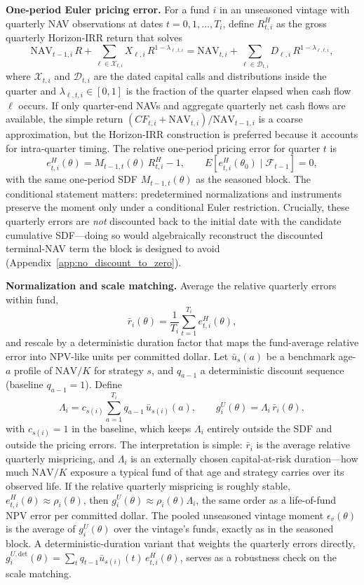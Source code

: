 \documentclass[11pt]{article}
\begin{document}
\textbf{One-period Euler pricing error.} For a fund \(i\) in an unseasoned vintage with quarterly NAV observations at dates \(t=0,1,\dots,T_i\), define \(R^H_{t,i}\) as the gross quarterly Horizon-IRR return that solves
\[
\mathrm{NAV}_{t-1,i}\,R
{}+
\sum_{\ell\in\mathcal X_{t,i}} X_{\ell,i}\, R^{1-\lambda_{\ell,t,i}}
=
\mathrm{NAV}_{t,i}
{}+
\sum_{\ell\in\mathcal D_{t,i}} D_{\ell,i}\, R^{1-\lambda_{\ell,t,i}},
\]
where \(\mathcal X_{t,i}\) and \(\mathcal D_{t,i}\) are the dated capital calls and distributions inside the quarter and \(\lambda_{\ell,t,i}\in[0,1]\) is the fraction of the quarter elapsed when cash flow \(\ell\) occurs. If only quarter-end NAVs and aggregate quarterly net cash flows are available, the simple return \((CF_{t,i}+\mathrm{NAV}_{t,i})/\mathrm{NAV}_{t-1,i}\) is a coarse approximation, but the Horizon-IRR construction is preferred because it accounts for intra-quarter timing. The relative one-period pricing error for quarter \(t\) is
\[
e^H_{t,i}(\theta)
=
M_{t-1,t}(\theta)\,R^H_{t,i}-1,
\qquad
E\!\left[e^H_{t,i}(\theta_0)\mid\mathcal F_{t-1}\right]=0,
\]
with the same one-period SDF \(M_{t-1,t}(\theta)\) as the seasoned block. The conditional statement matters: predetermined normalizations and instruments preserve the moment only under a conditional Euler restriction. Crucially, these quarterly errors are \emph{not} discounted back to the initial date with the candidate cumulative SDF---doing so would algebraically reconstruct the discounted terminal-NAV term the block is designed to avoid (Appendix~\ref{app:no_discount_to_zero}).

\textbf{Normalization and scale matching.} Average the relative quarterly errors within fund,
\[
\bar r_i(\theta)
=
\frac{1}{T_i}\sum_{t=1}^{T_i} e^H_{t,i}(\theta),
\]
and rescale by a deterministic duration factor that maps the fund-average relative error into NPV-like units per committed dollar. Let \(\bar u_s(a)\) be a benchmark age-\(a\) profile of \(\mathrm{NAV}/K\) for strategy \(s\), and \(q_{a-1}\) a deterministic discount sequence (baseline \(q_{a-1}=1\)). Define
\[
\Lambda_i
=
c_{s(i)}\sum_{a=1}^{T_i} q_{a-1}\,\bar u_{s(i)}(a),
\qquad
g_i^U(\theta)
=
\Lambda_i\,\bar r_i(\theta),
\]
with \(c_{s(i)}=1\) in the baseline, which keeps \(\Lambda_i\) entirely outside the SDF and outside the pricing errors. The interpretation is simple: \(\bar r_i\) is the average relative quarterly mispricing, and \(\Lambda_i\) is an externally chosen capital-at-risk duration---how much \(\mathrm{NAV}/K\) exposure a typical fund of that age and strategy carries over its observed life. If the relative quarterly mispricing is roughly stable, \(e^H_{t,i}(\theta)\approx\rho_i(\theta)\), then \(g_i^U(\theta)\approx\rho_i(\theta)\Lambda_i\), the same order as a life-of-fund NPV error per committed dollar. The pooled unseasoned vintage moment \(\epsilon_v(\theta)\) is the average of \(g_i^U(\theta)\) over the vintage's funds, exactly as in the seasoned block. A deterministic-duration variant that weights the quarterly errors directly, \(g_i^{U,\mathrm{det}}(\theta)=\sum_t q_{t-1}\bar u_{s(i)}(t)\,e^H_{t,i}(\theta)\), serves as a robustness check on the scale matching.
\end{document}
